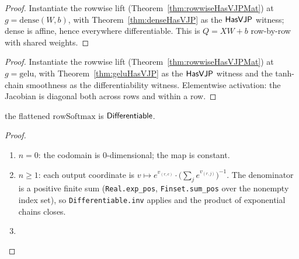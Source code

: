 \begin{theorem}
  \label{thm:densePerTokenHasVJPMat}
  \leanok
\end{theorem}

\begin{proof}
\leanok
Instantiate the rowwise lift (Theorem~\ref{thm:rowwiseHasVJPMat})
at \(g = \mathrm{dense}(W, b)\), with
Theorem~\ref{thm:denseHasVJP} as the \(\mathsf{HasVJP}\) witness; dense is
affine, hence everywhere differentiable. This is \(Q = XW + b\)
row-by-row with shared weights. \Qed{}
\end{proof}

\begin{theorem}
  \label{thm:geluPerTokenHasVJPMat}
  \leanok
\end{theorem}

\begin{proof}
\leanok
Instantiate the rowwise lift (Theorem~\ref{thm:rowwiseHasVJPMat})
at \(g = \mathrm{gelu}\), with Theorem~\ref{thm:geluHasVJP} as the
\(\mathsf{HasVJP}\) witness and the tanh-chain smoothness as the
differentiability witness. Elementwise activation: the Jacobian is
diagonal both across rows and within a row. \Qed{}
\end{proof}

\begin{theorem}
  \label{ax:rowSoftmax_flat_differentiable}
  \leanok
  \Prove{} the flattened \(\mathrm{rowSoftmax}\) is
  \(\mathsf{Differentiable}\).
\end{theorem}

\begin{proof}
\leanok
\begin{enumerate}
  \item \Case{} \(n = 0\): the codomain is \(0\)-dimensional; the map
    is constant. 
  \item \Case{} \(n \ge 1\): each output coordinate is
    \(v \mapsto e^{v_{(r, c)}} \cdot
      \bigl(\sum_j e^{v_{(r, j)}}\bigr)^{-1}\).
    The denominator is a positive finite sum
    (\texttt{Real.exp\_pos}, \texttt{Finset.sum\_pos} over the
    nonempty index set), so \texttt{Differentiable.inv} applies and
    the product of exponential chains closes.
  \item \Qed{}
\end{enumerate}
\end{proof}

